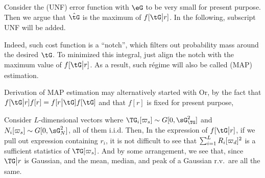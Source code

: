  Consider the  (UNF) error function  with \(\eG\) to be very small for present purpose.
Then we argue that \(\hat{\tG}\) is the maximum of \(f[\tG \big| r]\).
In the following, subscript UNF will be added. \par
Indeed, such cost function is a ``notch'', which filters out probability mass around the desired \(\tG\).
To minimized this integral, just align the notch with the maximum value of \(f[\tG \big| r]\).
As a result, such r\'egime will also be called  (MAP) estimation.

 Derivation of MAP estimation may alternatively started with  Or, by the fact that \(f[\tG \big| r] f[r] =f[r \big| \tG] f[\tG]\) and that \(f[r]\) is fixed for present purpose, 

 Consider \(L\)-dimensional vectors  where \(\TG_i[\VpG_s] \sim G[0,\sG_\TG^2]\) and \(N_i[\VpG_s] \sim G[0,\sG_N^2]\), all of them i.i.d. Then,  In the expression of \(f[\tG \big| r]\), if we pull out expression containing \(r_i\), it is not difficult to see that \(\sum_{i=1}^L R_i[\varpi_d]^2\) is a sufficient statistics of \(\TG[\VpG_s]\).
And by some arrangement, we see that,  since \(\TG \big| r\) is Gaussian, and the mean, median, and peak of a Gaussian r.v.\ are all the same.

